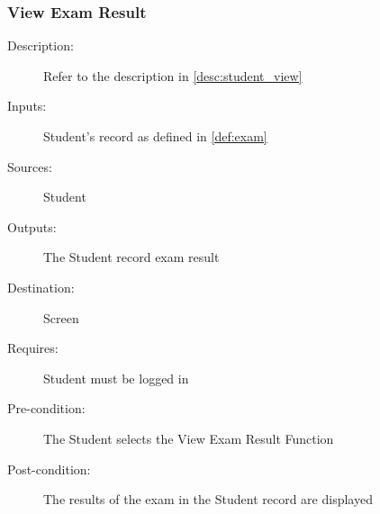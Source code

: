 \subsubsection{\large View Exam Result} 
\begin{boxed} %
\begin{description}
\item[Description:]
   Refer to the description in \autoref{desc:student_view}
\item[Inputs:]
   Student's record as defined in \autoref{def:exam}
\item[Sources:]
   Student
\item[Outputs:]
   The Student record exam result
\item[Destination:]
   Screen
\item[Requires:]
   Student must be logged in
\item[Pre-condition:]
   The Student selects the View Exam Result Function
\item[Post-condition:]
   The results of the exam in the Student record are displayed
\end{description}
\end{boxed} %
